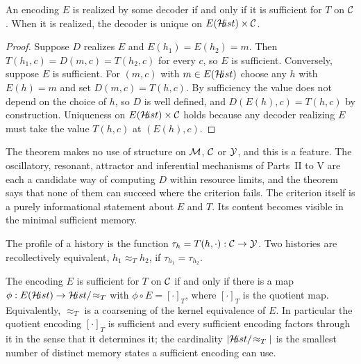 \begin{theorem}\label{thm:suff}
An encoding $E$ is realized by some decoder if and only if it is sufficient for $T$ on $\mathcal{C}$. When it is realized, the decoder is unique on $E(\mathcal{H}\!ist)\times\mathcal{C}$.
\end{theorem}

\begin{proof}
Suppose $D$ realizes $E$ and $E(h_1)=E(h_2)=m$. Then $T(h_1,c)=D(m,c)=T(h_2,c)$ for every $c$, so $E$ is sufficient. Conversely, suppose $E$ is sufficient. For $(m,c)$ with $m\in E(\mathcal{H}\!ist)$ choose any $h$ with $E(h)=m$ and set $D(m,c)=T(h,c)$. By sufficiency the value does not depend on the choice of $h$, so $D$ is well defined, and $D(E(h),c)=T(h,c)$ by construction. Uniqueness on $E(\mathcal{H}\!ist)\times\mathcal{C}$ holds because any decoder realizing $E$ must take the value $T(h,c)$ at $(E(h),c)$.
\end{proof}

The theorem makes no use of structure on $\mathcal{M}$, $\mathcal{C}$ or $\mathcal{Y}$, and this is a feature. The oscillatory, resonant, attractor and inferential mechanisms of Parts~II to V are each a candidate way of computing $D$ within resource limits, and the theorem says that none of them can succeed where the criterion fails. The criterion itself is a purely informational statement about $E$ and $T$. Its content becomes visible in the minimal sufficient memory.

\begin{definition}\label{def:profile}
The profile of a history is the function $\tau_h=T(h,\cdot):\mathcal{C}\to\mathcal{Y}$. Two histories are recollectively equivalent, $h_1\approx_Th_2$, if $\tau_{h_1}=\tau_{h_2}$.
\end{definition}

\begin{corollary}\label{cor:minimal}
The encoding $E$ is sufficient for $T$ on $\mathcal{C}$ if and only if there is a map $\phi:E(\mathcal{H}\!ist)\to\mathcal{H}\!ist/\!\approx_T$ with $\phi\circ E=[\cdot]_T$, where $[\cdot]_T$ is the quotient map. Equivalently, $\approx_T$ is a coarsening of the kernel equivalence of $E$. In particular the quotient encoding $[\cdot]_T$ is sufficient and every sufficient encoding factors through it in the sense that it determines it; the cardinality $|\mathcal{H}\!ist/\!\approx_T|$ is the smallest number of distinct memory states a sufficient encoding can use.
\end{corollary}


